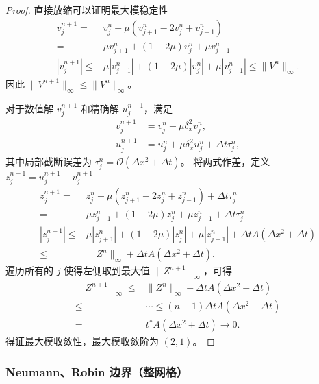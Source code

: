 \begin{proof}
    直接放缩可以证明最大模稳定性
    \begin{align*}
        v_{j}^{n+1} ={}     &
        v_j^{n} + \mu (v_{j+1}^{n}-2v_j^{n}+v_{j-1}^{n})                        \\
        ={}                 & \mu v_{j+1}^{n} + (1-2\mu)v_j^{n}+\mu v_{j-1}^{n} \\
        |v_{j}^{n+1}| \le{} &
        \mu |v_{j+1}^{n}| + (1-2\mu)|v_j^{n}|+\mu |v_{j-1}^{n}| \le{}  \|V^{n}\|_{\infty}.
    \end{align*}
    因此 $\|V^{n+1}\|_{\infty} \le{} \|V^{n}\|_{\infty}$。

    对于数值解 $v_{j}^{n+1}$ 和精确解 $u_{j}^{n+1}$，满足
    \begin{align*}
        v_{j}^{n+1} & = v_j^{n} + \mu \delta_x^2 v_j^{n},                       \\
        u_{j}^{n+1} & = u_j^{n} + \mu \delta_x^2 u_j^{n} + \Delta t \tau_j^{n},
    \end{align*}
    其中局部截断误差为 $\tau_j^{n} = \mathcal{O}(\Delta x^2 + \Delta t)$。
    将两式作差，定义 $z_{j}^{n+1}=u_{j}^{n+1}-v_{j}^{n+1}$
    \begin{align*}
        z_{j}^{n+1} ={}     &
        z_j^{n} + \mu (z_{j+1}^{n}-2z_j^{n}+z_{j-1}^{n}) + \Delta t \tau_j^{n}
        \\
        ={}                 & \mu z_{j+1}^{n} + (1-2\mu)z_j^{n}+\mu z_{j-1}^{n}+ \Delta t \tau_j^{n}
        \\
        |z_{j}^{n+1}| \le{} &
        \mu |z_{j+1}^{n}| + (1-2\mu)|z_j^{n}| + \mu |z_{j-1}^{n}| + \Delta t A (\Delta x^2 + \Delta t)
        \\
        \le{}               & \|Z^{n}\|_{\infty}+ \Delta t A (\Delta x^2 + \Delta t).
    \end{align*}
    遍历所有的 $j$ 使得左侧取到最大值 $\|Z^{n+1}\|_{\infty}$，可得
    \begin{align*}
        \|Z^{n+1}\|_{\infty} \le{} & \|Z^{n}\|_{\infty}+ \Delta t A (\Delta x^2 + \Delta t)
        \\ \le{} & \cdots \le (n+1)\Delta t A (\Delta x^2 + \Delta t) \\
        ={}                        & t^* A (\Delta x^2 + \Delta t) \to 0.
    \end{align*}
    得证最大模收敛性，最大模收敛阶为 $(2,1)$。
\end{proof}


\subsubsection{Neumann、Robin 边界（整网格）}

